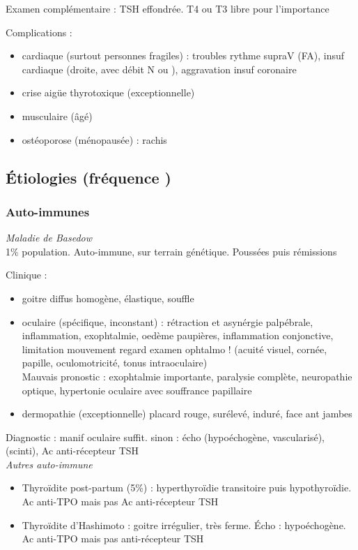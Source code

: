 \documentclass{book}
\begin{document}
Examen complémentaire : TSH effondrée. T4 ou T3 libre pour l'importance

Complications : 
\begin{itemize}
\item cardiaque (surtout personnes fragiles) : troubles rythme supraV (FA), insuf
cardiaque (droite, avec débit N ou \inc), aggravation insuf coronaire
\item crise aigüe thyrotoxique (exceptionnelle)
\item musculaire (âgé)
\item ostéoporose (\female ménopausée) : rachis
\end{itemize}

\subsection{Étiologies (fréquence \dec)}
\label{sec:orgf2b74f1}
\subsubsection{Auto-immunes}
\label{sec:org38daf52}
\emph{Maladie de Basedow}\\
1\% population. Auto-immune, sur terrain génétique. Poussées puis rémissions

Clinique : 
\begin{itemize}
\item goitre diffus homogène, élastique, souffle
\item oculaire (spécifique, inconstant) : rétraction et asynérgie palpébrale,
inflammation, exophtalmie, oedème paupières, inflammation conjonctive,
limitation mouvement regard
\thus examen ophtalmo ! (acuité visuel, cornée, papille, oculomotricité, tonus
intraoculaire)\\
Mauvais pronostic : exophtalmie importante, paralysie complète, neuropathie
optique, hypertonie oculaire avec souffrance papillaire
\item dermopathie (exceptionnelle) placard rouge, surélevé, induré, face ant jambes
\end{itemize}

Diagnostic : manif oculaire suffit. sinon : écho (hypoéchogène, vascularisé),
(scinti), Ac anti-récepteur TSH\\

\emph{Autres auto-immune}
\begin{itemize}
\item Thyroïdite post-partum (5\%) : hyperthyroïdie transitoire puis hypothyroïdie. Ac
anti-TPO mais pas Ac anti-récepteur TSH
\item Thyroïdite d'Hashimoto : goitre irrégulier, très ferme. Écho :
hypoéchogène. Ac anti-TPO mais pas anti-récepteur TSH
\end{itemize}
\end{document}
